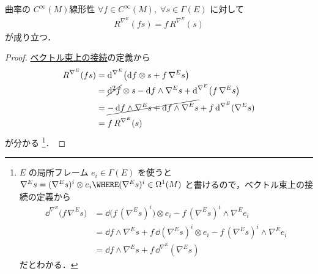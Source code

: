 \documentclass[geometry_main]{subfiles}
\begin{document}
\begin{myprop}[label=prop:curvature-linear]{曲率の $C^\infty(M)$線形性}
    $\forall f \in C^\infty(M),\; \forall s \in \Gamma(E)$ に対して
    \begin{align}
        R^{\nabla^E} (fs) = f\, R^{\nabla^E}(s)
    \end{align}
    が成り立つ．
\end{myprop}

\begin{proof}
    \hyperref[def:connection-vect]{ベクトル束上の接続}の定義から
    \begin{align}
        R^{\nabla^E} (fs)
        &= \dd^{\nabla^E} \bigl( \dd{f} \otimes s + f\, \nabla^E s \bigr) \\
        &= \cancel{\dd[2]{f}} \otimes s - \dd{f} \wedge \nabla^E s + \dd^{\nabla^E} \bigl( f\, \nabla^E s \bigr) \\
        &= \cancel{-\dd{f} \wedge \nabla^E s + \dd{f} \wedge \nabla^E s} + f\, \dd^{\nabla^E} (\nabla^E s) \\
        &= f\, R^{\nabla^E} (s)
    \end{align}
    が分かる
    \footnote{
        $E$ の局所フレーム $e_i \in \Gamma(E)$ を使うと $\nabla^E s = (\nabla^E s)^i \otimes e_i \WHERE  (\nabla^E s)^i \in \Omega^1(M)$ と書けるので，ベクトル束上の接続の定義から
        \begin{align}
            \dd^{\nabla^E} \bigl( f\, \nabla^E s \bigr)
            &= \dd{\bigl(f\, (\nabla^E s)^i\bigr)} \otimes e_i - f\, (\nabla^E s)^i \wedge \nabla^E e_i \\
            &= \dd{f} \wedge \nabla^E s + f\, \dd{(\nabla^E s)^i} \otimes e_i  - f\, (\nabla^E s)^i \wedge \nabla^E e_i \\
            &= \dd{f} \wedge \nabla^E s + f\, \dd^{\nabla^E} (\nabla^E s)
        \end{align}
        だとわかる．
    }．
\end{proof}
\end{document}
